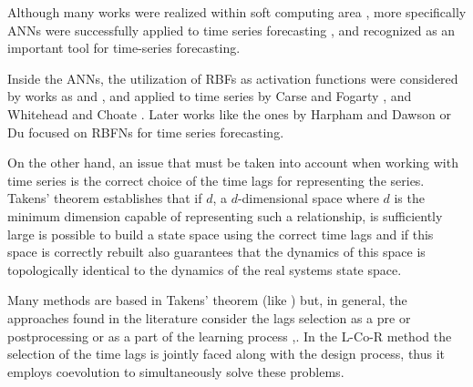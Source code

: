 \documentclass[a4paper,twoside]{article}
\newcommand{\metodo}{L-Co-R}
\begin{document}
Although many works were realized within soft computing area%
, more specifically ANNs were successfully applied to time series forecasting \cite{Jain2007}%
, and recognized as an important tool for time-series forecasting. %


Inside the ANNs, the utilization of RBFs as activation functions were considered by works as \cite{Broomhead88} and \cite{Rivas04}, and applied to time series by Carse and Fogarty \cite{Carse1996}, and Whitehead and Choate \cite{Whitehead96}. Later works like the ones by Harpham and Dawson \cite{Harpham06} or  Du \cite{Du2008} focused on RBFNs for time series forecasting.


On the other hand, an issue that must be taken into account when working with time series is the correct choice of the time lags for representing the series. Takens' theorem \cite{Takens1980} establishes that if $d$, a $d$-dimensional space where $d$ is the minimum dimension capable of representing such a relationship, is sufficiently large is possible to build a state space using the correct time lags and if this space is correctly rebuilt also guarantees that the dynamics of this space is topologically identical to the dynamics of the real systems state space.

Many methods are based in Takens' theorem (like \cite{Luko2010}) but, in general, the approaches found in the literature consider the lags selection as a pre or postprocessing or as a part of the learning process \cite{Araujo2010a},\cite{Maus2011}. In the {\metodo} method the selection of the time lags is jointly faced along with the design process, thus it employs coevolution to simultaneously solve these problems.
\end{document}
